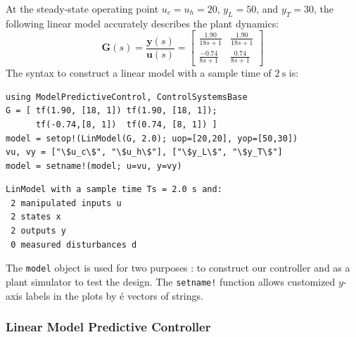 At the steady-state operating point $u_c=u_h=20$, $y_L=50$, and $y_T=30$, the following linear model accurately describes the plant dynamics:
\begin{equation}
\mathbf{G}(s) = \frac{\mathbf{y}(s)}{\mathbf{u}(s)} =
\begin{bmatrix}
    \frac{1.90}{18s+1} & \frac{1.90}{18s+1} \\[3pt]
    \frac{-0.74}{8s+1} & \frac{0.74}{8s+1}
\end{bmatrix}
\end{equation}
The syntax to construct a linear model with a sample time of $\SI{2}{\second}$ is:
\begin{verbatim}
using ModelPredictiveControl, ControlSystemsBase
G = [ tf(1.90, [18, 1]) tf(1.90, [18, 1]);
      tf(-0.74,[8, 1])  tf(0.74, [8, 1]) ]
model = setop!(LinModel(G, 2.0); uop=[20,20], yop=[50,30])
vu, vy = ["\$u_c\$", "\$u_h\$"], ["\$y_L\$", "\$y_T\$"]
model = setname!(model; u=vu, y=vy)
\end{verbatim}
\spacerepl
\begin{verbatim}
LinModel with a sample time Ts = 2.0 s and:
 2 manipulated inputs u
 2 states x
 2 outputs y
 0 measured disturbances d
\end{verbatim}
The \texttt{model} object is used for two purposes : to construct our controller and as a plant simulator to test the design. The \texttt{setname!} function allows customized $y$-axis labels in the plots by é vectors of strings.

\subsubsection{Linear Model Predictive Controller}

